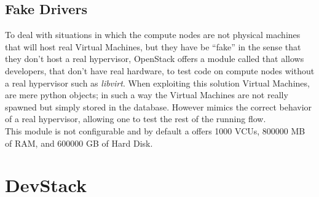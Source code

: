 \subsection{Fake Drivers}
\label{sec:openstack_fake_drivers}
To deal with situations in which the compute nodes are not physical machines that will host real Virtual Machines, but they have be ``fake'' in the sense that they don't host a real hypervisor, OpenStack offers a module called  that allows developers, that don't have real hardware, to test  code on compute nodes without a real hypervisor such as \textit{libvirt}. When exploiting this solution Virtual Machines, are mere python objects; in such a way the Virtual Machines are not really spawned but simply stored in the database. However  mimics the correct behavior of a real hypervisor, allowing one to test the rest of the  running flow.\\
This module is not configurable and by default a  offers 1000 VCUs, 800000 MB of RAM, and 600000 GB of Hard Disk. 

\section{DevStack}
\label{sec:devstack}
 
